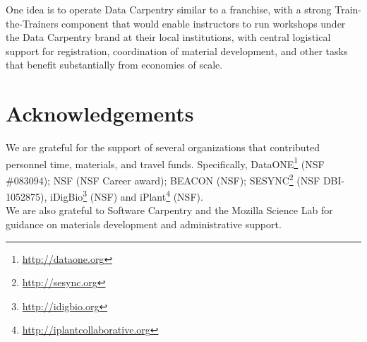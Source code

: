 \documentclass[15]{idcc}
\begin{document}
One idea is to operate Data Carpentry similar to a franchise, with a strong Train-the-Trainers component that would enable instructors to run workshops under the Data Carpentry brand at their local institutions, with central logistical support for registration, coordination of material development, and other tasks that benefit substantially from economies of scale.


\section{Acknowledgements}

We are grateful for the support of several organizations that contributed personnel time, materials, and travel funds. Specifically, DataONE\footnote{\url{http://dataone.org}} (NSF \#083094); NSF (NSF Career award); BEACON (NSF); SESYNC\footnote{\url{http://sesync.org}} (NSF DBI-1052875), iDigBio\footnote{\url{http://idigbio.org}} (NSF) and iPlant\footnote{\url{http://iplantcollaborative.org}} (NSF).\\
We are also grateful to Software Carpentry and the Mozilla Science Lab for guidance on materials development and administrative support.
\end{document}

